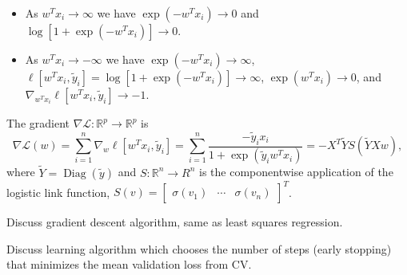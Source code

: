 \documentclass{article}
\DeclareMathOperator*{\Diag}{Diag}
\begin{document}
\begin{itemize}
\item As $w^T x_i\rightarrow \infty$ we have
  $\exp(-w^T x_i)\rightarrow 0$ and
  $\log [1+\exp(- w^T x_i)]\rightarrow 0$.
\item As $w^T x_i\rightarrow -\infty$ we have
  $\exp(-w^T x_i)\rightarrow \infty$,
  $\ell[w^T x_i, \tilde y_i] = \log [1+\exp(- w^T x_i)]\rightarrow \infty$,
  $\exp(w^T x_i)\rightarrow 0$, and $\nabla_{w^T x_i} \ell[w^T x_i, \tilde y_i] \rightarrow -1$.
\end{itemize}


The gradient $\nabla\mathcal L:\mathbb R^p\rightarrow\mathbb R^p$ is
\begin{equation*}
\nabla \mathcal L(w) = \sum_{i=1}^n \nabla_w \ell[w^T x_i, \tilde y_i] = 
\sum_{i=1}^n \frac{
  -\tilde y_i x_i
}{
  1+\exp(\tilde y_i w^T x_i)
} = -X^T \tilde Y S(\tilde Y X w),
\end{equation*}
where $\tilde Y=\Diag(\tilde y)$ and $S:\mathbb R^n\rightarrow R^n$ is the componentwise application
of the logistic link function,
$S(v) = \left[
    \begin{array}{ccc}
      \sigma(v_1) & \cdots & \sigma(v_n)
    \end{array}
\right]^T$.

Discuss gradient descent algorithm, same as least squares regression.

Discuss learning algorithm which chooses the number of steps (early
stopping) that minimizes the mean validation loss from CV.
\end{document}
